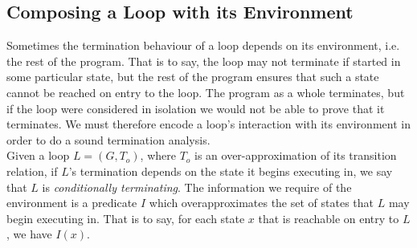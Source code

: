 \documentclass[preprint]{sigplanconf}
\theoremstyle{definition}
\newtheorem{definition}[theorem]{Definition}
\begin{document}
\begin{figure*}
\begin{framed}
 \end{framed}

\end{figure*}

\subsection{Composing a Loop with its Environment} \label{sec:env}

Sometimes the termination behaviour of a loop depends on its environment, i.e. the rest of the program.  That is to say,
the loop may not terminate if started in some particular state, but the rest of the program
ensures that such a state cannot be reached on entry to the loop.  The program as a whole
terminates, but if the loop were considered in isolation we would not be able to prove that
it terminates. We must therefore encode a loop's interaction with its environment %
in order to do a sound termination analysis.\\

\iffalse
Let us assume that we have done some preprocessing of our program which has identified
loops, straight line code blocks and the control flow between these.  In particular,
the control flow analysis has determined which order these code blocks execute in,
and the nesting structure of the loops.
\fi

Given a loop $L=(G,T_o)$, where $T_o$ is an over-approximation of its transition relation, 
if $L$'s termination depends on the state it begins
executing in, we say that $L$ is \emph{conditionally terminating}.
The information we require of the environment is a predicate $I$ which
overapproximates the set of states that $L$ may begin executing in.
That is to say, for each state $x$ that is reachable on entry to $L$,
we have $I(x)$.
\end{document}
